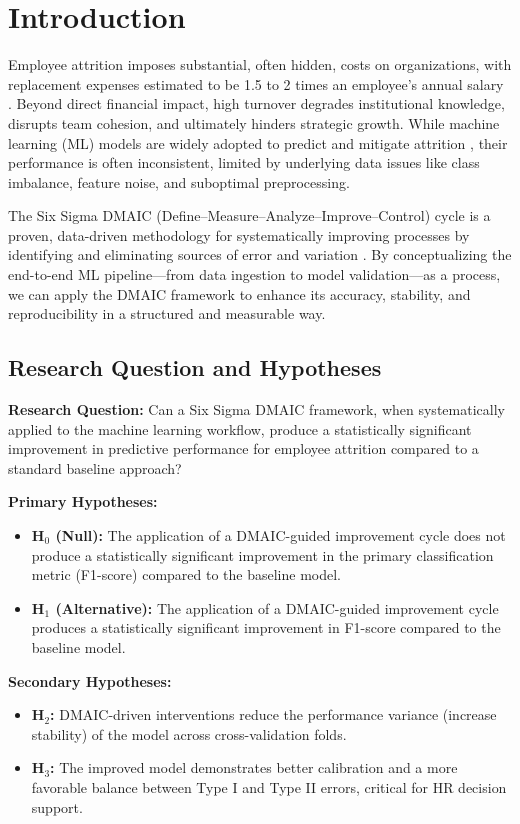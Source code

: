 \documentclass[conference]{IEEEtran}
\begin{document}
\section{Introduction}

Employee attrition imposes substantial, often hidden, costs on organizations, with replacement expenses estimated to be 1.5 to 2 times an employee's annual salary \cite{cascio2019investing}. Beyond direct financial impact, high turnover degrades institutional knowledge, disrupts team cohesion, and ultimately hinders strategic growth. While machine learning (ML) models are widely adopted to predict and mitigate attrition \cite{jain2021employee, sisodia2018prediction}, their performance is often inconsistent, limited by underlying data issues like class imbalance, feature noise, and suboptimal preprocessing.

The Six Sigma DMAIC (Define--Measure--Analyze--Improve--Control) cycle is a proven, data-driven methodology for systematically improving processes by identifying and eliminating sources of error and variation \cite{pyzdek2014six}. By conceptualizing the end-to-end ML pipeline---from data ingestion to model validation---as a process, we can apply the DMAIC framework to enhance its accuracy, stability, and reproducibility in a structured and measurable way.

\subsection{Research Question and Hypotheses}

\textbf{Research Question:} Can a Six Sigma DMAIC framework, when systematically applied to the machine learning workflow, produce a statistically significant improvement in predictive performance for employee attrition compared to a standard baseline approach?

\textbf{Primary Hypotheses:}
\begin{itemize}
    \item \textbf{H$_0$ (Null):} The application of a DMAIC-guided improvement cycle does not produce a statistically significant improvement in the primary classification metric (F1-score) compared to the baseline model.
    \item \textbf{H$_1$ (Alternative):} The application of a DMAIC-guided improvement cycle produces a statistically significant improvement in F1-score compared to the baseline model.
\end{itemize}

\textbf{Secondary Hypotheses:}
\begin{itemize}
    \item \textbf{H$_2$:} DMAIC-driven interventions reduce the performance variance (increase stability) of the model across cross-validation folds.
    \item \textbf{H$_3$:} The improved model demonstrates better calibration and a more favorable balance between Type I and Type II errors, critical for HR decision support.
\end{itemize}
\end{document}
